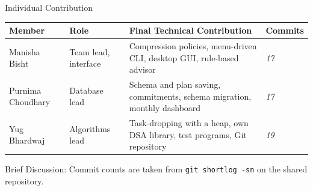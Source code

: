 \documentclass[aspectratio=169,11pt]{beamer}
\newcommand{\smallnote}[1]{%
\vspace{0.08cm}
{\scriptsize\color{GEUGrey}#1}
}
\newcommand{\placeholder}[1]{%
\textit{\color{GEUGrey}#1}
}
\begin{document}
\begin{frame}{Individual Contribution}

\scriptsize

\begin{center}

\renewcommand{\arraystretch}{1.35}

\begin{tabularx}{.96\textwidth}
{@{}p{1.8cm}p{1.8cm}X p{1.5cm}@{}}

\toprule
Member &
Role &
Final Technical Contribution &
Commits\\
\midrule

Manisha Bisht &
Team lead, interface &
Compression policies, menu-driven CLI, desktop GUI, rule-based advisor &
\placeholder{17}\\

Purnima Choudhary &
Database lead &
Schema and plan saving, commitments, schema migration, monthly dashboard &
\placeholder{17}\\

Yug Bhardwaj &
Algorithms lead &
Task-dropping with a heap, own DSA library, test programs, Git repository &
\placeholder{19}\\

\bottomrule

\end{tabularx}

\end{center}

\vspace{3mm}


\smallnote{
Brief Discussion: Commit counts are taken from \texttt{git shortlog -sn} on the shared repository.
}

\end{frame}
\end{document}

